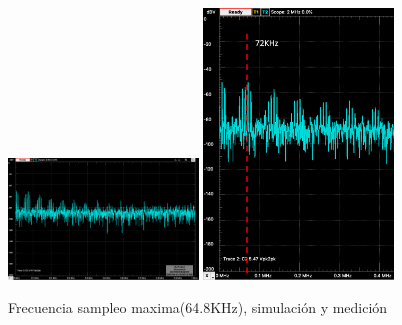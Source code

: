 \documentclass[../../ASSD_TP1_G7.tex]{subfiles}
\begin{document}
\begin{figure}[H]
\centering
{}
{\includegraphics[width=0.45\textwidth]{figures/simpto_8_syh_64,8_espectro.png}}
{\includegraphics[width=0.45\textwidth]{figures/pto_8_syh_64,8_espectro.png}}
\caption{Frecuencia sampleo maxima(64.8KHz), simulación y medición}
\end{figure}
\end{document}
